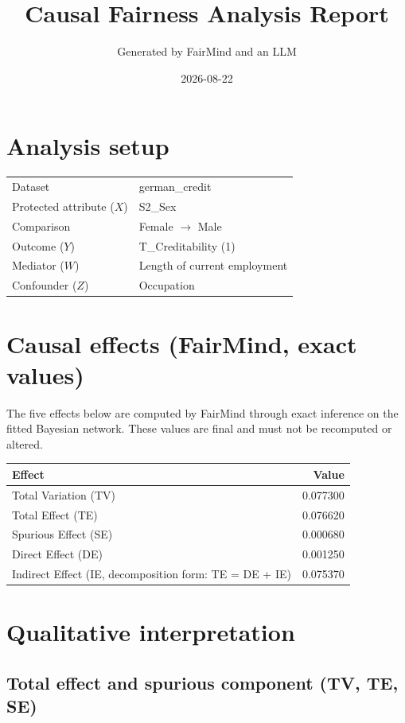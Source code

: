 \documentclass[11pt]{article}
\title{Causal Fairness Analysis Report}
\author{Generated by FairMind and an LLM}
\date{2026-08-22}
\begin{document}
\maketitle

\section{Analysis setup}

\begin{tabular}{ll}
\toprule
Dataset & german\_credit \\
Protected attribute ($X$) & S2\_Sex \\
Comparison & Female $\to$ Male \\
Outcome ($Y$) & T\_Creditability (1) \\
Mediator ($W$) & Length of current employment \\
Confounder ($Z$) & Occupation \\
\bottomrule
\end{tabular}

\section{Causal effects (FairMind, exact values)}

The five effects below are computed by FairMind through exact inference on the
fitted Bayesian network. These values are final and must not be recomputed or
altered.

\begin{tabular}{lr}
\toprule
Effect & Value \\
\midrule
Total Variation (TV) & 0.077300 \\
Total Effect (TE) & 0.076620 \\
Spurious Effect (SE) & 0.000680 \\
Direct Effect (DE) & 0.001250 \\
Indirect Effect (IE, decomposition form: TE = DE + IE) & 0.075370 \\
\bottomrule
\end{tabular}

\section{Qualitative interpretation}

\subsection{Total effect and spurious component (TV, TE, SE)}
\end{document}
